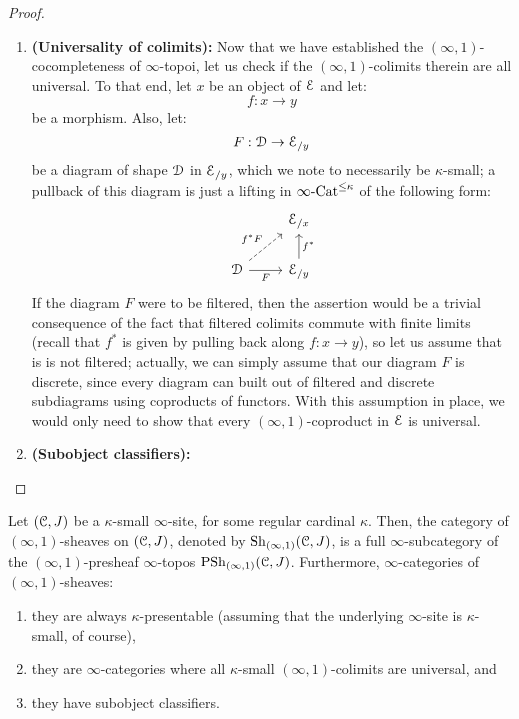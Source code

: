\begin{proof}
\begin{enumerate}
                            \item \textbf{(Universality of colimits):} Now that we have established the $(\infty, 1)$-cocompleteness of $\infty$-topoi, let us check if the $(\infty, 1)$-colimits therein are all universal. To that end, let $x$ be an object of $\mathcal{E}$ and let:
                                $$f: x \to y$$
                            be a morphism. Also, let:
                                $$F: \mathcal{D} \to \mathcal{E}_{/y}$$
                            be a diagram of shape $\mathcal{D}$ in $\mathcal{E}_{/y}$, which we note to necessarily be $\kappa$-small; a pullback of this diagram is just a lifting in $\infty\text{-}\mathrm{Cat}^{\leq \kappa}$ of the following form:
                                $$
                                    \begin{tikzcd}
                                    	& {\E_{/x}} \\
                                    	\D & {\E_{/y}}
                                    	\arrow["{f^*}"', from=2-2, to=1-2]
                                    	\arrow["F"', from=2-1, to=2-2]
                                    	\arrow["{f^*F}", dashed, from=2-1, to=1-2]
                                    \end{tikzcd}
                                $$
                            If the diagram $F$ were to be filtered, then the assertion would be a trivial consequence of the fact that filtered colimits commute with finite limits (recall that $f^*$ is given by pulling back along $f: x \to y$), so let us assume that is is not filtered; actually, we can simply assume that our diagram $F$ is discrete, since every diagram can built out of filtered and discrete subdiagrams using coproducts of functors. With this assumption in place, we would only need to show that every $(\infty, 1)$-coproduct in $\mathcal{E}$ is universal. 
                            \item \textbf{(Subobject classifiers):}
                        \end{enumerate}
                    \end{proof}
                \begin{proposition} \label{prop: infinity_categories_of_higher_sheaves}
                    Let $(\mathcal{C}, J)$ be a $\kappa$-small $\infty$-site, for some regular cardinal $\kappa$. Then, the category of $(\infty, 1)$-sheaves on $(\mathcal{C}, J)$, denoted by $\mathrm{Sh}_{(\infty, 1)}(\mathcal{C}, J)$, is a full $\infty$-subcategory of the $(\infty, 1)$-presheaf $\infty$-topos $\mathrm{PSh}_{(\infty, 1)}(\mathcal{C}, J)$. Furthermore, $\infty$-categories of $(\infty, 1)$-sheaves:
                        \begin{enumerate}
                            \item they are always $\kappa$-presentable (assuming that the underlying $\infty$-site is $\kappa$-small, of course),
                            \item they are $\infty$-categories where all $\kappa$-small $(\infty, 1)$-colimits are universal, and
                            \item they have subobject classifiers.
                        \end{enumerate}
                \end{proposition}
